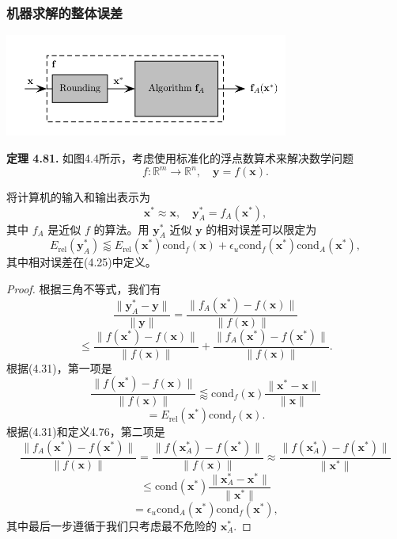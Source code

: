 \documentclass[a4paper]{ctexart}
\begin{document}
{\subsubsection{机器求解的整体误差}

\begin{center}
  \includegraphics[width = 0.7\textwidth]{images/error.png}
\end{center}

\noindent \textbf{定理 4.81.} 如图4.4所示，考虑使用标准化的浮点数算术来解决数学问题
\[
f: \mathbb{R}^m \rightarrow \mathbb{R}^n, \quad \mathbf{y} = f(\mathbf{x}).
\]

将计算机的输入和输出表示为
\[
\mathbf{x}^* \approx \mathbf{x}, \quad \mathbf{y}_A^* = f_A(\mathbf{x}^*),
\]
其中 \( f_A \) 是近似 \( f \) 的算法。用 \( \mathbf{y}_A^* \) 近似 \( \mathbf{y} \) 的相对误差可以限定为
\[
  E_{\text{rel}}(\mathbf{y}_A^*) \lessapprox E_{\text{rel}}(\mathbf{x}^*) \text{cond}_f(\mathbf{x}) + \epsilon_u \text{cond}_f(\mathbf{x}^*) \text{cond}_A(\mathbf{x}^*),
\]
其中相对误差在(4.25)中定义。

\begin{proof}
根据三角不等式，我们有
\[
  \frac{\|\mathbf{y}_A^* - \mathbf{y}\|}{\|\mathbf{y}\|} = \frac{\|f_A(\mathbf{x}^*) - f(\mathbf{x})\|}{\|f(\mathbf{x})\|}
\]
\[
  \leq \frac{\|f(\mathbf{x}^*) - f(\mathbf{x})\|}{\|f(\mathbf{x})\|} + \frac{\|f_A(\mathbf{x}^*) - f(\mathbf{x}^*)\|}{\|f(\mathbf{x})\|}.
\]
根据(4.31)，第一项是
\[
  \frac{\|f(\mathbf{x}^*) - f(\mathbf{x})\|}{\|f(\mathbf{x})\|} \lessapprox \text{cond}_f(\mathbf{x}) \frac{\|\mathbf{x}^* - \mathbf{x}\|}{\|\mathbf{x}\|}
\]
\[
  = E_{\text{rel}}(\mathbf{x}^*) \text{cond}_f(\mathbf{x}).
\]
根据(4.31)和定义4.76，第二项是
\[
  \frac{\|f_A(\mathbf{x}^*) - f(\mathbf{x}^*)\|}{\|f(\mathbf{x})\|} = \frac{\|f(\mathbf{x}_A^*) - f(\mathbf{x}^*)\|}{\|f(\mathbf{x})\|} \approx \frac{\|f(\mathbf{x}_A^*) - f(\mathbf{x}^*)\|}{\|\mathbf{x}^*\|}
\]
\[
  \leq \text{cond}(\mathbf{x}^*) \frac{\|\mathbf{x}_A^* - \mathbf{x}^*\|}{\|\mathbf{x}^*\|}
\]
\[
  = \epsilon_u \text{cond}_A(\mathbf{x}^*) \text{cond}_f(\mathbf{x}^*),
\]
其中最后一步遵循于我们只考虑最不危险的 \( \mathbf{x}_A^* \).
\end{proof}

}
\end{document}

